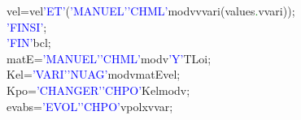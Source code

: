 \hspace*{1em}\hspace*{1em}\hspace*{1em}\hspace*{1em}\hspace*{1em}\hspace*{1em}vel\hspace*{1em}=\hspace*{1em}vel\hspace*{1em}\textcolor{blue}{'ET'}\hspace*{1em}(\textcolor{blue}{'MANUEL'}\hspace*{1em}\textcolor{blue}{'CHML'}\hspace*{1em}modv\hspace*{1em}vvari\hspace*{1em}(values\textcolor{green}{.}vvari));\\
\hspace*{1em}\hspace*{1em}\hspace*{1em}\textcolor{blue}{'FINSI'};\\
\textcolor{blue}{'FIN'}\hspace*{1em}bcl;\\
matE\hspace*{1em}=\hspace*{1em}\textcolor{blue}{'MANUEL'}\hspace*{1em}\textcolor{blue}{'CHML'}\hspace*{1em}modv\hspace*{1em}\textcolor{blue}{'Y'}\hspace*{1em}TLoi;\\
Kel\hspace*{1em}=\hspace*{1em}\textcolor{blue}{'VARI'}\hspace*{1em}\textcolor{blue}{'NUAG'}\hspace*{1em}modv\hspace*{1em}matE\hspace*{1em}vel;\\
Kpo\hspace*{1em}=\hspace*{1em}\textcolor{blue}{'CHANGER'}\hspace*{1em}\textcolor{blue}{'CHPO'}\hspace*{1em}Kel\hspace*{1em}modv\hspace*{1em};\\
evabs\hspace*{1em}=\hspace*{1em}\textcolor{blue}{'EVOL'}\hspace*{1em}\textcolor{blue}{'CHPO'}\hspace*{1em}vpo\hspace*{1em}lx\hspace*{1em}vvar;\\
